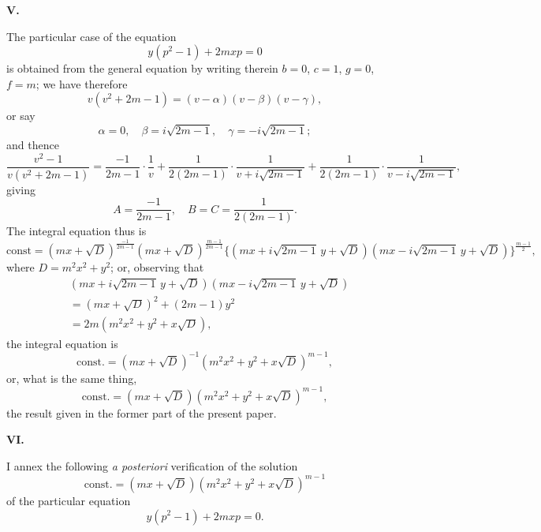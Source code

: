 \documentclass[11pt,a4paper]{article}
\begin{document}
\newpage
\noindent \textbf{V.}

\medskip

\noindent The particular case of the equation
\[
y(p^2-1) + 2mxp = 0
\]
is obtained from the general equation by writing therein $b=0$, $c=1$, $g=0$, $f=m$; we have therefore
\[
v(v^2 + 2m - 1) = (v-\alpha)(v-\beta)(v-\gamma),
\]
or say
\[
\alpha = 0, \quad \beta = i\sqrt{2m-1}, \quad \gamma = -i\sqrt{2m-1};
\]
and thence
\[
\frac{v^2-1}{v(v^2+2m-1)} = \frac{-1}{2m-1} \cdot \frac{1}{v} + \frac{1}{2(2m-1)} \cdot \frac{1}{v + i\sqrt{2m-1}} + \frac{1}{2(2m-1)} \cdot \frac{1}{v - i\sqrt{2m-1}},
\]
giving
\[
A = \frac{-1}{2m-1}, \quad B = C = \frac{1}{2(2m-1)}.
\]
The integral equation thus is
\[
\text{const} = (mx + \sqrt{D})^{\frac{-1}{2m-1}} (mx + \sqrt{D})^{\frac{m-1}{2m-1}} \{(mx + i\sqrt{2m-1}\,y + \sqrt{D})(mx - i\sqrt{2m-1}\,y + \sqrt{D})\}^{\frac{m-1}{2}},
\]
where $D = m^2 x^2 + y^2$; or, observing that
\begin{align*}
&(mx + i\sqrt{2m-1}\,y + \sqrt{D})(mx - i\sqrt{2m-1}\,y + \sqrt{D}) \\
&= (mx + \sqrt{D})^2 + (2m-1)y^2 \\
&= 2m(m^2 x^2 + y^2 + x\sqrt{D}),
\end{align*}
the integral equation is
\[
\text{const.} = (mx + \sqrt{D})^{-1}(m^2 x^2 + y^2 + x\sqrt{D})^{m-1},
\]
or, what is the same thing,
\[
\text{const.} = (mx + \sqrt{D})(m^2 x^2 + y^2 + x\sqrt{D})^{m-1},
\]
the result given in the former part of the present paper.

\bigskip
\noindent \textbf{VI.}

\medskip

\noindent I annex the following \textit{a posteriori} verification of the solution
\[
\text{const.} = (mx + \sqrt{D})(m^2 x^2 + y^2 + x\sqrt{D})^{m-1}
\]
of the particular equation
\[
y(p^2-1) + 2mxp = 0.
\]
\end{document}
